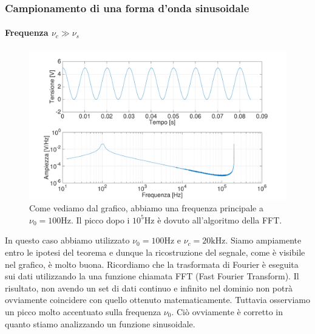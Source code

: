 \subsubsection{Campionamento di una forma d'onda sinusoidale}

\paragraph{Frequenza $\nu_c \gg \nu_s$ \newline}

\begin{figure}[H]
\centering
	\includegraphics[width=.63\textwidth]{../E13/latex/sin100hz@17000,200000.pdf}
	\caption{Come vediamo dal grafico, abbiamo una frequenza principale a $\nu_0=100 \si{\hertz}$. Il picco dopo i $10^5\si{\hertz}$ è dovuto all'algoritmo della FFT.}
	\label{sin1}
\end{figure}

In questo caso abbiamo utilizzato $\nu_0=100 \si{\hertz}$ e $\nu_c=20 \si{\kilo\hertz}$. Siamo ampiamente entro le ipotesi del teorema e dunque la ricostruzione del segnale, come è visibile nel grafico, è molto buona. Ricordiamo che la trasformata di Fourier è eseguita sui dati utilizzando la una funzione chiamata FFT (Fast Fourier Transform). Il risultato, non avendo un set di dati continuo e infinito nel dominio non potrà ovviamente coincidere con quello ottenuto matematicamente. Tuttavia osserviamo un picco molto accentuato sulla frequenza $\nu_0$. Ciò ovviamente è corretto in quanto stiamo analizzando un funzione sinusoidale.



